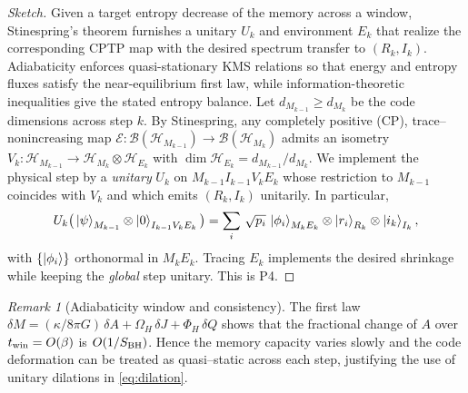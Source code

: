 \documentclass[a4paper,11pt]{article}
\theoremstyle{plain}
\theoremstyle{definition}
\theoremstyle{remark}
\newtheorem{remark}{Remark}
\begin{document}
\begin{proof}[Sketch]
Given a target entropy decrease of the memory across a window, Stinespring's theorem furnishes a unitary $U_k$ and environment $E_k$
that realize the corresponding CPTP map with the desired spectrum transfer to $(R_k,I_k)$. Adiabaticity enforces quasi-stationary KMS
relations so that energy and entropy fluxes satisfy the near-equilibrium first law, while information-theoretic inequalities give the
stated entropy balance.
Let $d_{M_{k-1}}\ge d_{M_k}$ be the code dimensions across step $k$. By Stinespring, any completely positive (CP), trace--nonincreasing map $\mathcal{E}:\mathcal{B}(\mathcal{H}_{M_{k-1}})\to\mathcal{B}(\mathcal{H}_{M_k})$ admits an isometry $V_k:\mathcal{H}_{M_{k-1}}\to\mathcal{H}_{M_k}\otimes\mathcal{H}_{E_k}$ with $\dim\mathcal{H}_{E_k}=d_{M_{k-1}}/d_{M_k}$. We implement the physical step by a \emph{unitary} $U_k$ on $M_{k-1}I_{k-1}V_kE_k$ whose restriction to $M_{k-1}$ coincides with $V_k$ and which emits $(R_k,I_k)$ unitarily. In particular,
\begin{equation}
\label{eq:dilation}
U_k\big(\left|\psi\right\rangle_{M_{k-1}}\otimes\left|0\right\rangle_{I_{k-1}V_kE_k}\big)
=\sum_{i}\,\sqrt{p_i}\,\left|\phi_i\right\rangle_{M_k E_k}\otimes\left|r_i\right\rangle_{R_k}\otimes\left|i_k\right\rangle_{I_k},
\end{equation}
with $\{\left|\phi_i\right\rangle\}$ orthonormal in $M_kE_k$. Tracing $E_k$ implements the desired shrinkage while keeping the \emph{global} step unitary. This is P4.
\end{proof}

\begin{remark}[Adiabaticity window and consistency]\label{rem:adiabaticity_window}
The first law $\delta M=(\kappa/8\pi G)\,\delta A + \Omega_H\,\delta J+\Phi_H\,\delta Q$ shows that the fractional change of $A$ over $t_{\rm win}=O(\beta)$ is $O(1/S_{\rm BH})$. Hence the memory capacity varies slowly and the code deformation can be treated as quasi--static across each step, justifying the use of unitary dilations in \eqref{eq:dilation}.
\end{remark}
\end{document}
